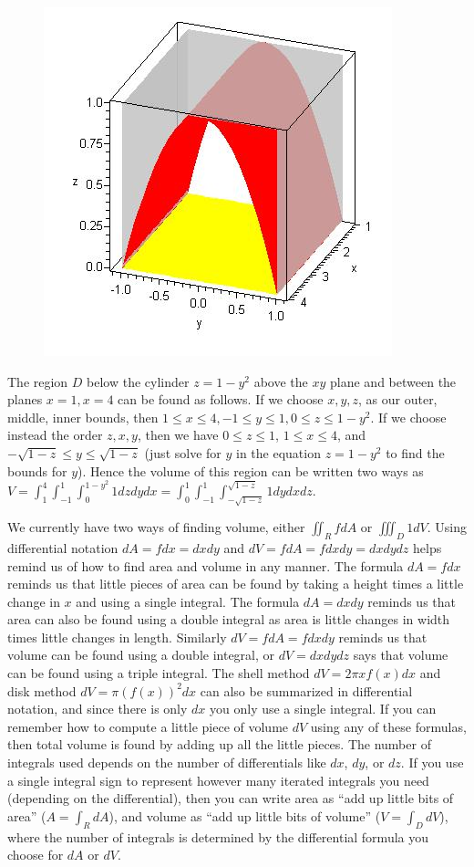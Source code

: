 \begin{figure}
\newcommand{\myheight}{.8in}
\includegraphics[height=\myheight]{10-SurfaceTripleIntegrals/support/triple-2}
\end{figure}
The region $D$ below the cylinder $z=1-y^2$ above the $xy$ plane and
between the planes $x=1,x=4$ can be found as follows.  If we choose
$x,y,z$, as our outer, middle, inner bounds, then $1\leq x\leq 4,-1\leq y\leq 1,0\leq
z\leq 1-y^2$.  If we choose instead the order $z,x,y$, then we have $0\leq
z\leq 1$, $1\leq x\leq 4$, and $-\sqrt{1-z}\leq y\leq \sqrt{1-z}$ (just solve for $y$
in the equation $z=1-y^2$ to find the bounds for $y$).  Hence the
volume of this region can be written two ways as
$V=\int_{1}^{4}\int_{-1}^{1}\int_{0}^{1-y^2}1 dz dy dx =
\int_{0}^{1}\int_{-1}^{1}\int_{-\sqrt{1-z}}^{\sqrt{1-z}}1 dy dx dz$. 

We currently have two ways of finding volume, either $\iint_R fdA$ or
$\iiint_D 1 dV$.  Using differential notation $dA=fdx=dxdy$ and $dV =
fdA = fdxdy = dxdydz$ helps remind us of how to find area and volume
in any manner.  The formula $dA=fdx$ reminds us that little pieces of
area can be found by taking a height times a little change in $x$ and
using a single integral.  The formula $dA = dxdy$ reminds us that area
can also be found using a double integral as area is little changes in
width times little changes in length.  Similarly $dV=fdA=fdxdy$
reminds us that volume can be found using a double integral, or
$dV=dxdydz$ says that volume can be found using a triple integral.
The shell method $dV=2\pi xf(x)dx$ and disk method $dV = \pi (f(x))^2dx$
can also be summarized in differential notation, and since there is
only $dx$ you only use a single integral.  If you can remember how to
compute a little piece of volume $dV$ using any of these formulas,
then total volume is found by adding up all the little pieces. The
number of integrals used depends on the number of differentials like
$dx$, $dy$, or $dz$. If you use a single integral sign to represent
however many iterated integrals you need (depending on the
differential), then you can write area as ``add up little bits of
area'' ($A=\int_RdA$), and volume as ``add up little bits of volume''
($V=\int_D dV$), where the number of integrals is determined by the
differential formula you choose for $dA$ or $dV$.

